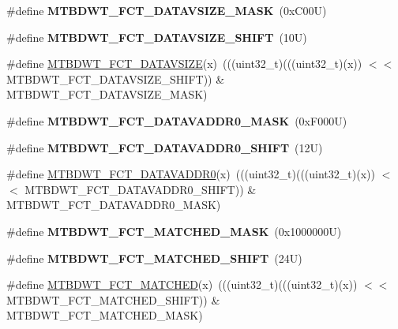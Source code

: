 \begin{DoxyCompactItemize}
\mbox{\label{group___m_t_b_d_w_t___register___masks_gac5562a9a6e64541583f2c3335e92e26e}} 
\#define {\bfseries M\+T\+B\+D\+W\+T\+\_\+\+F\+C\+T\+\_\+\+D\+A\+T\+A\+V\+S\+I\+Z\+E\+\_\+\+M\+A\+SK}~(0x\+C00\+U)
\item 
\mbox{\label{group___m_t_b_d_w_t___register___masks_gab273df7e6bc41ff730a16ed3bda34c0d}} 
\#define {\bfseries M\+T\+B\+D\+W\+T\+\_\+\+F\+C\+T\+\_\+\+D\+A\+T\+A\+V\+S\+I\+Z\+E\+\_\+\+S\+H\+I\+FT}~(10\+U)
\item 
\#define \mbox{\hyperlink{group___m_t_b_d_w_t___register___masks_ga5ab7bcca4526fbe61852979008a12b83}{M\+T\+B\+D\+W\+T\+\_\+\+F\+C\+T\+\_\+\+D\+A\+T\+A\+V\+S\+I\+ZE}}(x)~(((uint32\+\_\+t)(((uint32\+\_\+t)(x)) $<$$<$ M\+T\+B\+D\+W\+T\+\_\+\+F\+C\+T\+\_\+\+D\+A\+T\+A\+V\+S\+I\+Z\+E\+\_\+\+S\+H\+I\+FT)) \& M\+T\+B\+D\+W\+T\+\_\+\+F\+C\+T\+\_\+\+D\+A\+T\+A\+V\+S\+I\+Z\+E\+\_\+\+M\+A\+SK)
\item 
\mbox{\label{group___m_t_b_d_w_t___register___masks_ga75b2d3a8190ba867f64fd6dfe5454bdf}} 
\#define {\bfseries M\+T\+B\+D\+W\+T\+\_\+\+F\+C\+T\+\_\+\+D\+A\+T\+A\+V\+A\+D\+D\+R0\+\_\+\+M\+A\+SK}~(0x\+F000\+U)
\item 
\mbox{\label{group___m_t_b_d_w_t___register___masks_gaafd0b0f0d3b07005320d859fa2d3ce30}} 
\#define {\bfseries M\+T\+B\+D\+W\+T\+\_\+\+F\+C\+T\+\_\+\+D\+A\+T\+A\+V\+A\+D\+D\+R0\+\_\+\+S\+H\+I\+FT}~(12\+U)
\item 
\#define \mbox{\hyperlink{group___m_t_b_d_w_t___register___masks_gac85a2abfaa79aea7181e6a5e73a8f468}{M\+T\+B\+D\+W\+T\+\_\+\+F\+C\+T\+\_\+\+D\+A\+T\+A\+V\+A\+D\+D\+R0}}(x)~(((uint32\+\_\+t)(((uint32\+\_\+t)(x)) $<$$<$ M\+T\+B\+D\+W\+T\+\_\+\+F\+C\+T\+\_\+\+D\+A\+T\+A\+V\+A\+D\+D\+R0\+\_\+\+S\+H\+I\+FT)) \& M\+T\+B\+D\+W\+T\+\_\+\+F\+C\+T\+\_\+\+D\+A\+T\+A\+V\+A\+D\+D\+R0\+\_\+\+M\+A\+SK)
\item 
\mbox{\label{group___m_t_b_d_w_t___register___masks_ga7d1a477cd50c957daaeabd24ae8a2092}} 
\#define {\bfseries M\+T\+B\+D\+W\+T\+\_\+\+F\+C\+T\+\_\+\+M\+A\+T\+C\+H\+E\+D\+\_\+\+M\+A\+SK}~(0x1000000\+U)
\item 
\mbox{\label{group___m_t_b_d_w_t___register___masks_ga50433f9cbc4ffe91e3fe13b764bb78a9}} 
\#define {\bfseries M\+T\+B\+D\+W\+T\+\_\+\+F\+C\+T\+\_\+\+M\+A\+T\+C\+H\+E\+D\+\_\+\+S\+H\+I\+FT}~(24\+U)
\item 
\#define \mbox{\hyperlink{group___m_t_b_d_w_t___register___masks_ga33e6d2634521bfb953c0391e400e0b4e}{M\+T\+B\+D\+W\+T\+\_\+\+F\+C\+T\+\_\+\+M\+A\+T\+C\+H\+ED}}(x)~(((uint32\+\_\+t)(((uint32\+\_\+t)(x)) $<$$<$ M\+T\+B\+D\+W\+T\+\_\+\+F\+C\+T\+\_\+\+M\+A\+T\+C\+H\+E\+D\+\_\+\+S\+H\+I\+FT)) \& M\+T\+B\+D\+W\+T\+\_\+\+F\+C\+T\+\_\+\+M\+A\+T\+C\+H\+E\+D\+\_\+\+M\+A\+SK)
\end{DoxyCompactItemize}
